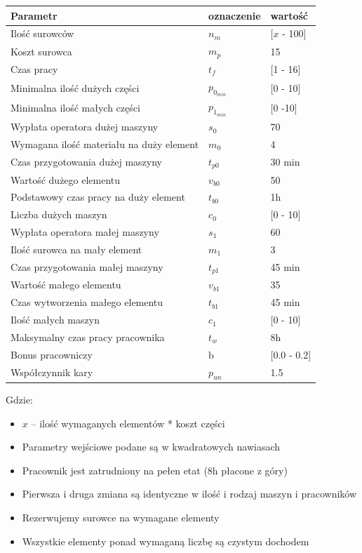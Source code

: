 \documentclass[a4paper]{article}
\begin{document}
\begin{longtable}[c]{lll}
Parametr & oznaczenie & wartość\\ \hline
Ilość surowców & $n_m$ & [$x$ - 100]\\
Koszt surowca & $m_p$ & 15\\
Czas pracy & $t_f$ & [1 - 16]\\
Minimalna ilość dużych części & $p_{0_{min}}$ & [0 - 10]\\
Minimalna ilość małych części & $p_{1_{min}}$ & [0 -10]\\
Wypłata operatora dużej maszyny & $s_0$ & 70\\
Wymagana ilość materiału na duży element & $m_0$ & 4\\
Czas przygotowania dużej maszyny & $t_{p0}$ & 30 min\\
Wartość dużego elementu & $v_{b0}$ & 50\\
Podstawowy czas pracy na duży element & $t_{b0}$ & 1h\\
Liczba dużych maszyn & $c_0$ & [0 - 10]\\
Wypłata operatora małej maszyny & $s_1$ & 60\\
Ilość surowca na mały element & $m_1$ & 3\\
Czas przygotowania małej maszyny & $t_{p1}$ & 45 min\\
Wartość małego elementu & $v_{b1}$ & 35\\
Czas wytworzenia małego elementu & $t_{b1}$ & 45 min\\
Ilość małych maszyn & $c_1$ & [0 - 10]\\
Maksymalny czas pracy pracownika & $t_w$ & 8h\\
Bonus pracowniczy & b & [0.0 - 0.2]\\
Współczynnik kary & $p_{un}$ & 1.5
\end{longtable}

Gdzie:
\begin{itemize}
    \item $x$ -- ilość wymaganych elementów * koszt części 
    \item Parametry wejściowe podane są w kwadratowych nawiasach
    \item Pracownik jest zatrudniony na pełen etat (8h płacone z góry)
    \item Pierwsza i druga zmiana są identyczne w ilość i rodzaj maszyn i pracowników
    \item Rezerwujemy surowce na wymagane elementy
    \item Wszystkie elementy ponad wymaganą liczbę są czystym dochodem
\end{itemize}
\end{document}
